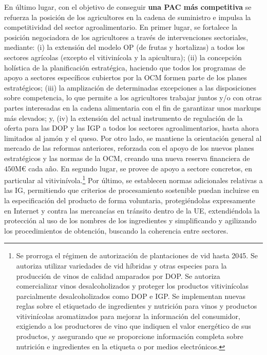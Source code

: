 \documentclass[10pt,a4paper]{article}
\begin{document}
En último lugar, con el objetivo de conseguir \textbf{una PAC más competitiva} se refuerza la posición de los agricultores en la cadena de suministro e impulsa la competitividad del sector agroalimentario. En primer lugar, se fortalece la posición negociadora de los agricultores a través de intervenciones sectoriales, mediante: (i) la extensión del modelo OP (de frutas y hortalizas) a todos los sectores agrícolas (excepto el vitivinícola y la apicultura); (ii) la concepción holística de la planificación estratégica, haciendo que todos los programas de apoyo a sectores específicos cubiertos por la OCM formen parte de los planes estratégicos; (iii) la amplización de determinadas excepciones a las disposiciones sobre competencia, lo que permite a los agricultores trabajar juntos y/o con otras partes interesadas en la cadena alimentaria con el fin de garantizar unos markups más elevados; y, (iv) la extensión del actual instrumento de regulación de la oferta para las DOP y las IGP a todos los sectores agroalimentarios, hasta ahora limitados al jamón y el queso. Por otro lado, se mantiene la orientación general al mercado de las reformas anteriores, reforzada con el apoyo de los nuevos planes estratégicos y las normas de la OCM, creando una nueva reserva financiera de $450\text{M}€$ cada año. En segundo lugar, se provee de apoyo a sectore concretos, en particular al vitivinívola.\footnote{%
    Se prorroga el régimen de autorización de plantaciones de vid hasta 2045. Se autoriza utilizar variedades de vid híbridas y otras especies para la producción de vinos de calidad amparados por DOP. Se autoriza comercializar vinos desalcoholizados y proteger los productos vitivinícolas parcialmente desalcoholizados como DOP e IGP. Se implementan nuevas reglas sobre el etiquetado de ingredientes y nutrición para vinos y productos vitivinícolas aromatizados para mejorar la información del consumidor, exigiendo a los productores de vino que indiquen el valor energético de sus productos, y asegurando que se proporcione información completa sobre nutrición e ingredientes en la etiqueta o por medios electrónicos.
} Por último, se establecen normas adicionales relativas a las IG, permitiendo que criterios de procesamiento sostenible puedan incluirse en la especificación del producto de forma voluntaria, protegiéndolas expresamente en Internet y contra las mercancías en tránsito dentro de la UE, extendiéndola la protección al uso de los nombres de los ingredientes y simplificando y agilizando los procedimientos de obtención, buscando la coherencia entre sectores.
\end{document}

